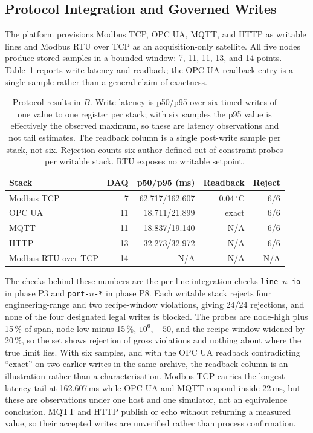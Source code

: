 \subsection{Protocol Integration and Governed Writes}
\label{sec:port}
\label{sec:dynamic}
\label{sec:plc}
\label{sec:govsurface}
The platform provisions Modbus TCP, OPC UA, MQTT, and HTTP as writable lines and
Modbus RTU over TCP as an acquisition-only satellite. All five nodes produce stored
samples in a bounded window: 7, 11, 11, 13, and 14 points. Table~\ref{tab:plc} reports write latency and readback; the OPC UA readback entry is a single sample rather than a general claim of exactness.

\begin{table}[!t]
\centering
\caption{Protocol results in $B$. Write latency is p50/p95 over six timed writes
of one value to one register per stack; with six samples the p95 value is
effectively the observed maximum, so these are latency observations and not tail
estimates. The readback column is a single post-write sample per stack, not six.
Rejection counts six author-defined out-of-constraint probes per writable stack.
RTU exposes no writable setpoint.}
\label{tab:plc}
\scriptsize
\setlength{\tabcolsep}{3.4pt}
\begin{tabular}{@{}lrrrr@{}}
\toprule
Stack & DAQ & p50/p95 (ms) & Readback & Reject \\
\midrule
Modbus TCP & 7 & 62.717/162.607 & $0.04\,^\circ$C & 6/6 \\
OPC UA & 11 & 18.711/21.899 & exact & 6/6 \\
MQTT & 11 & 18.837/19.140 & N/A & 6/6 \\
HTTP & 13 & 32.273/32.972 & N/A & 6/6 \\
Modbus RTU over TCP & 14 & N/A & N/A & N/A \\
\bottomrule
\end{tabular}
\end{table}

The checks behind these numbers are the per-line integration checks \texttt{line-$n$-io} in phase P3 and \texttt{port-$n$-*} in phase P8. Each writable stack rejects four engineering-range and two recipe-window
violations, giving 24/24 rejections, and none of the four designated legal writes is blocked.
The probes are node-high plus 15\,\% of span, node-low minus 15\,\%,
$10^{6}$, $-50$, and the recipe window widened by 20\,\%, so the set shows rejection
of gross violations and nothing about where the true limit lies. With six samples,
and with the OPC UA readback contradicting ``exact'' on two earlier writes in the
same archive, the readback column is an illustration rather than a characterisation.
Modbus TCP carries the longest latency tail at 162.607\,ms while OPC UA and MQTT
respond inside 22\,ms, but these are observations under one host and one simulator,
not an equivalence conclusion. MQTT and HTTP publish or echo without returning a
measured value, so their accepted writes are unverified rather than process
confirmation.

